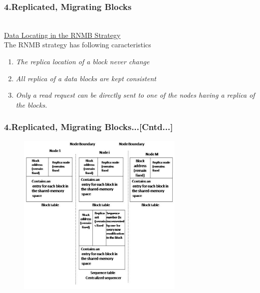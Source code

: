 \documentclass{beamer}
\begin{document}
\begin{frame}
	\frametitle{4.Replicated, Migrating Blocks}
	\\
	\vspace{0.5cm}	
	\underline{Data Locating in the RNMB Strategy}\\
	\vspace{0.25cm}
	The RNMB strategy has following caracteristics
	\vspace{0.25cm}
	\begin{enumerate}
		\item \textit{The replica location of a block never change}
		\item \textit{All replica of a data blocks are kept consistent}
		\item \textit{Only a read request can be directly sent to one of the nodes having a replica of the blocks.}
	\end{enumerate}
\end{frame}


\begin{frame}
	\frametitle{4.Replicated, Migrating Blocks...[Cntd...]}
	\begin{figure}
		\centering
		\includegraphics[width=8cm]{fig516.jpg}
		\label{fig516}
	\end{figure}
\end{frame}
\end{document}
